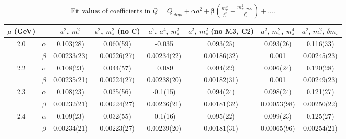 \documentclass[12pt]{extarticle}
\begin{document}
\begin{table}[h!]
\begin{center}
\begin{tabular}{|c c|c|c|c|c|c|c|}
\hline
$\mu$ (GeV) &  & $a^2$, $m_\pi^2$& $a^2$, $m_\pi^2$ (no C)& $a^2$, $a^4$, $m_\pi^2$& $a^2$, $m_\pi^2$ (no M3, C2)& $a^2$, $m_\pi^2$, $m_\pi^4$& $a^2$, $m_\pi^2$, $\delta m_s$\\
\hline
\multirow{2}{0.5in}{2.0} & $\alpha$ & 0.103(28)& 0.060(59)& -0.035& 0.093(25)& 0.093(26)& 0.116(33)\\
 & $\beta$ & 0.00233(23)& 0.00226(27)& 0.00234(22)& 0.00186(32)& 0.001& 0.00245(23)\\
\hline
\multirow{2}{0.5in}{2.2} & $\alpha$ & 0.108(23)& 0.044(57)& -0.089& 0.094(22)& 0.096(24)& 0.120(28)\\
 & $\beta$ & 0.00235(21)& 0.00224(27)& 0.00238(20)& 0.00182(31)& 0.001& 0.00249(23)\\
\hline
\multirow{2}{0.5in}{2.3} & $\alpha$ & 0.108(23)& 0.035(56)& -0.1(15)& 0.094(24)& 0.098(24)& 0.121(27)\\
 & $\beta$ & 0.00232(21)& 0.00224(27)& 0.00236(21)& 0.00181(32)& 0.00053(98)& 0.00250(22)\\
\hline
\multirow{2}{0.5in}{2.4} & $\alpha$ & 0.109(23)& 0.032(55)& -0.1(16)& 0.095(22)& 0.099(23)& 0.125(27)\\
 & $\beta$ & 0.00234(21)& 0.00223(27)& 0.00239(20)& 0.00181(31)& 0.00065(96)& 0.00254(21)\\
\hline
\end{tabular}
\caption{Fit values of coefficients in $Q = Q_{phys} + \mathbf{\alpha} a^2 + \mathbf{\beta}\left(\frac{m_\pi^2}{f_\pi^2}-\frac{m_{\pi,PDG}^2}{f_\pi^2}\right) + \ldots$.}
\end{center}
\end{table}
























\clearpage
\end{document}
